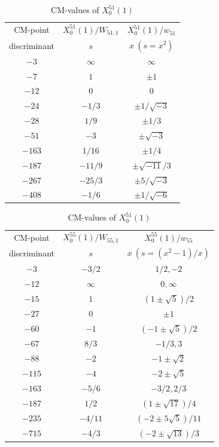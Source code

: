 \documentclass{amsart}
\theoremstyle{definition}
\begin{document}
\begin{appendices}
\renewcommand{\arraystretch}{1.5}
\tabcolsep=10pt                         
\begin{table}
\begin{tabular}{|c|c|c|}
\hline
CM-point& ${X_{0}^{51}(1)/W_{51,1}}$ & ${X_{0}^{51}(1)/w_{51}}$  \\ 
       discriminant   & $s$ & $x\ (s=x^2)$   \\ \hline
${-3}$ & $\infty$ & $\infty$   \\ 
${-7}$ & $1$ & $\pm 1$  \\ 
${-12}$ & $0$ & $ 0$  \\ 
${-24}$ & $-{1}/{3}$ & $\pm{1}/{\sqrt{-3}}$ \\ 
${-28}$ & ${1}/{9}$ & $\pm{1}/{3}$ \\ 
${-51}$ & $-3$ & $\pm\sqrt{-3}$  \\ 
${-163}$ & ${1}/{16}$ & $ \pm{1}/{4}$   \\
${-187}$ & $-{11}/{9}$ & $\pm{\sqrt{-11}}/{3}$  \\
${-267}$ & $-{25}/{3}$ & $\pm{5}/{\sqrt{-3}}$  \\ 
${-408}$ & $-{1}/{6}$ & $ \pm{1}/{\sqrt{-6}}$ \\ \hline
\end{tabular}
\bigskip
\caption{CM-values of $X^{51}_0(1)$}




\begin{tabular}{|c|c|c|}
\hline
CM-point& ${X_{0}^{55}(1)/W_{55,1}}$ & ${X_{0}^{55}(1)/w_{55}}$ \\ 
        discriminant  & $s$ & $x\ (s=(x^2-1)/{x})$   \\ \hline
${-3}$ & $-{3}/{2}$ & ${1}/{2},-2$  \\ 
${-12}$ & $\infty$ & $0,\infty$ \\ 
${-15}$ & $1$ & $(1\pm\sqrt{5})/{2}$  \\ 
${-27}$ & $0$ & $ \pm1$  \\ 
${-60}$ & $-1$ & $(-1\pm\sqrt{5})/{2}$  \\ 
${-67}$ & ${8}/{3}$ & $-{1}/{3},3$ \\ 
${-88}$ & $-2$ & $-1\pm\sqrt{2}$ \\ 
${-115}$ & $-4$ & $ -2\pm\sqrt{5}$ \\ 
${-163}$ & $-{5}/{6}$ & $-{3}/{2},{2}/{3}$ \\
${-187}$ & ${1}/{2}$ & $(1\pm\sqrt{17})/{4}$  \\ 

${-235}$ & $-{4}/{11}$ & $(-2\pm5\sqrt{5})/{11}$  \\ 
${-715}$ & $-{4}/{3}$ & $(-2\pm\sqrt{13})/{3}$  \\ \hline




\end{tabular}
\end{table}
\end{appendices}
\end{document}
